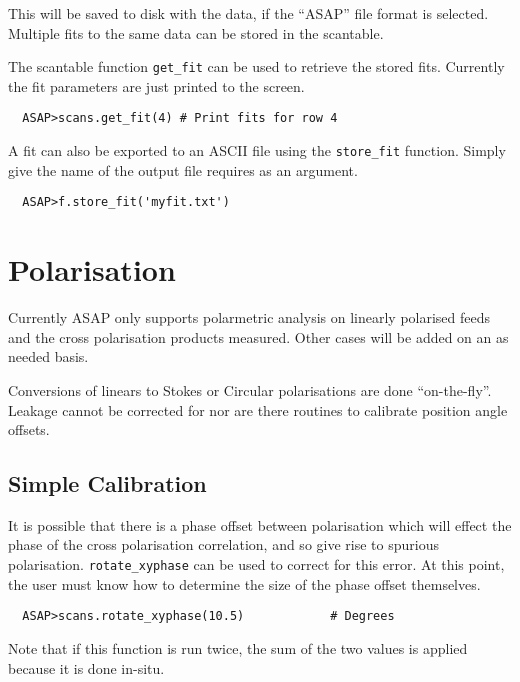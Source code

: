 \documentclass[11pt]{article}
\newcommand{\cmd}[1]{{\tt #1}}
\begin{document}
This will be saved to disk with the data, if the ``ASAP'' file format
is selected. Multiple fits to the same data can be stored in the
scantable.

The scantable function \cmd{get\_fit} can be used to retrieve the
stored fits. Currently the fit parameters are just printed to the
screen.

\begin{verbatim}
  ASAP>scans.get_fit(4) # Print fits for row 4
\end{verbatim}

A fit can also be exported to an ASCII file using the \cmd{store\_fit}
function. Simply give the name of the output file requires as an
argument.

\begin{verbatim}
  ASAP>f.store_fit('myfit.txt')
\end{verbatim}

\section{Polarisation}

Currently ASAP only supports polarmetric analysis
on linearly polarised feeds and the cross polarisation products
measured. Other cases will be added on an as needed basis.

Conversions of linears to Stokes or Circular polarisations are done
``on-the-fly''. Leakage cannot be corrected for nor are there routines
to calibrate position angle offsets.

\subsection{Simple Calibration}

It is possible that there is a phase
offset between polarisation which will effect the phase of the cross
polarisation correlation, and so give rise to spurious
polarisation. \cmd{rotate\_xyphase} can be used to correct for this
error. At this point, the user must know how to determine the size of
the phase offset themselves.

\begin{verbatim}
  ASAP>scans.rotate_xyphase(10.5)            # Degrees
\end{verbatim}

Note that if this function is run twice, the sum of the two values is
applied because it is done in-situ.
\end{document}
